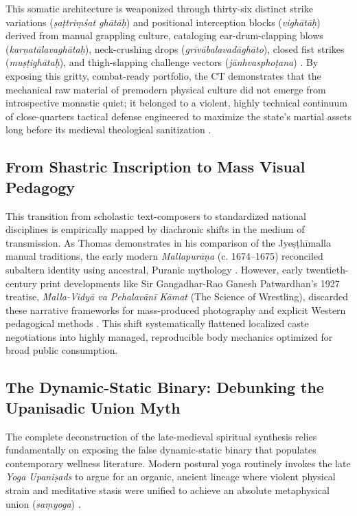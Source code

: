 \documentclass[11pt,twoside,letterpaper]{article}
\begin{document}
This somatic architecture is weaponized through thirty-six distinct strike variations (\textit{ṣaṭtriṃśat ghātāḥ}) and positional interception blocks (\textit{vighātāḥ}) derived from manual grappling culture, cataloging ear-drum-clapping blows (\textit{karṇatālavaghātaḥ}), neck-crushing drops (\textit{grīvābalavadāghāto}), closed fist strikes (\textit{muṣṭighātaḥ}), and thigh-slapping challenge vectors (\textit{jānhvasphoṭana}) \citep{MP_7, OHanlon2007}. By exposing this gritty, combat-ready portfolio, the CT demonstrates that the mechanical raw material of premodern physical culture did not emerge from introspective monastic quiet; it belonged to a violent, highly technical continuum of close-quarters tactical defense engineered to maximize the state's martial assets long before its medieval theological sanitization \citep{MP_7, Wujastyk2025}.


\subsection{From Shastric Inscription to Mass Visual Pedagogy}
This transition from scholastic text-composers to standardized national disciplines is empirically mapped by diachronic shifts in the medium of transmission. As Thomas demonstrates in his comparison of the Jyeṣṭhīmalla manual traditions, the early modern \textit{Mallapurāṇa} (c. 1674–1675) reconciled subaltern identity using ancestral, Puranic mythology \citep{Thomas2025}. However, early twentieth-century print developments like Sir Gangadhar-Rao Ganesh Patwardhan's 1927 treatise, \textit{Malla-Vidyā va Pehalavānī Kāmat} (The Science of Wrestling), discarded these narrative frameworks for mass-produced photography and explicit Western pedagogical methods \citep{Patwardhan1927, Thomas2025}. This shift systematically flattened localized caste negotiations into highly managed, reproducible body mechanics optimized for broad public consumption.

\subsection{The Dynamic-Static Binary: Debunking the Upanisadic Union Myth}
The complete deconstruction of the late-medieval spiritual synthesis relies fundamentally on exposing the false dynamic-static binary that populates contemporary wellness literature. Modern postural yoga routinely invokes the late \textit{Yoga Upaniṣads} to argue for an organic, ancient lineage where violent physical strain and meditative stasis were unified to achieve an absolute metaphysical union (\textit{saṃyoga}) \citep{Bouy1994}. 
\end{document}

